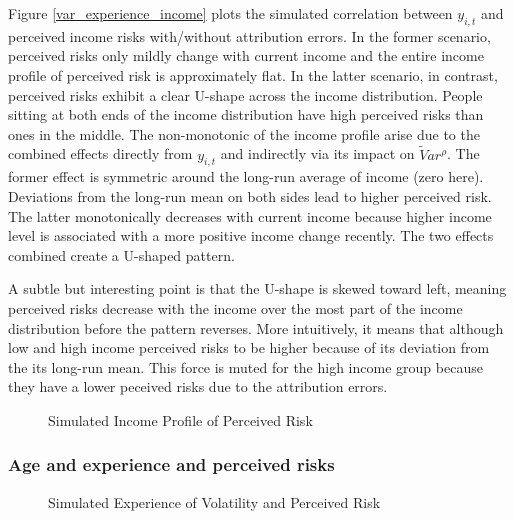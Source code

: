 \documentclass[12pt,notitlepage,onecolumn,aps,pra]{article}
\begin{document}
Figure \ref{var_experience_income} plots the simulated correlation
between \(y_{i,t}\) and perceived income risks with/without attribution
errors. In the former scenario, perceived risks only mildly change with
current income and the entire income profile of perceived risk is
approximately flat. In the latter scenario, in contrast, perceived risks
exhibit a clear U-shape across the income distribution. People sitting
at both ends of the income distribution have high perceived risks than
ones in the middle. The non-monotonic of the income profile arise due to
the combined effects directly from \(y_{i,t}\) and indirectly via its
impact on \(\tilde Var^{\rho}\). The former effect is symmetric around
the long-run average of income (zero here). Deviations from the long-run
mean on both sides lead to higher perceived risk. The latter
monotonically decreases with current income because higher income level
is associated with a more positive income change recently. The two
effects combined create a U-shaped pattern.

A subtle but interesting point is that the U-shape is skewed toward
left, meaning perceived risks decrease with the income over the most
part of the income distribution before the pattern reverses. More
intuitively, it means that although low and high income perceived risks
to be higher because of its deviation from the its long-run mean. This
force is muted for the high income group because they have a lower
peceived risks due to the attribution errors.


    \begin{figure*}[!ht]
        \begin{center}\end{center}
        \caption{Simulated Income Profile of Perceived Risk}
        \label{fig:recent_var_sim}
    \end{figure*}
    
    \hypertarget{age-and-experience-and-perceived-risks}{%
\subsubsection{Age and experience and perceived
risks}\label{age-and-experience-and-perceived-risks}}


    \begin{figure*}[!ht]
        \begin{center}\end{center}
        \caption{Simulated Experience of Volatility and Perceived Risk}
        \label{fig:var_experience_var_sim}
    \end{figure*}
    
\end{document}

